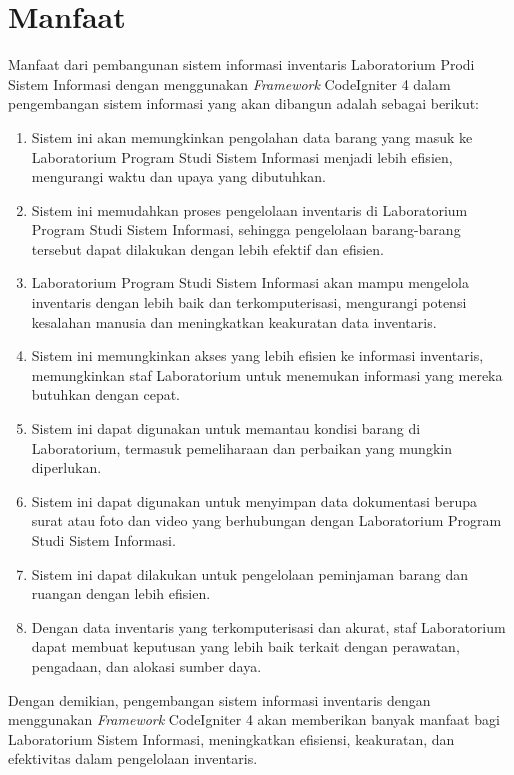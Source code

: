 \section{Manfaat}

Manfaat dari pembangunan sistem informasi inventaris Laboratorium Prodi Sistem Informasi dengan menggunakan \textit{Framework} CodeIgniter 4 dalam pengembangan sistem informasi yang akan dibangun adalah sebagai berikut:

\begin{enumerate}
  \item Sistem ini akan memungkinkan pengolahan data barang yang masuk ke Laboratorium Program Studi Sistem Informasi menjadi lebih efisien, mengurangi waktu dan upaya yang dibutuhkan.
  \item Sistem ini memudahkan proses pengelolaan inventaris di Laboratorium Program Studi Sistem Informasi, sehingga pengelolaan barang-barang tersebut dapat dilakukan dengan lebih efektif dan efisien.
  \item Laboratorium Program Studi Sistem Informasi akan mampu mengelola inventaris dengan lebih baik dan terkomputerisasi, mengurangi potensi kesalahan manusia dan meningkatkan keakuratan data inventaris.
  \item Sistem ini memungkinkan akses yang lebih efisien ke informasi inventaris, memungkinkan staf Laboratorium untuk menemukan informasi yang mereka butuhkan dengan cepat.
  \item Sistem ini dapat digunakan untuk memantau kondisi barang di Laboratorium, termasuk pemeliharaan dan perbaikan yang mungkin diperlukan.
  \item Sistem ini dapat digunakan untuk menyimpan data dokumentasi berupa surat atau foto dan video yang berhubungan dengan Laboratorium Program Studi Sistem Informasi.
  \item Sistem ini dapat dilakukan untuk pengelolaan peminjaman barang dan ruangan dengan lebih efisien.
  \item Dengan data inventaris yang terkomputerisasi dan akurat, staf Laboratorium dapat membuat keputusan yang lebih baik terkait dengan perawatan, pengadaan, dan alokasi sumber daya.

\end{enumerate}

Dengan demikian, pengembangan sistem informasi inventaris dengan menggunakan \textit{Framework} CodeIgniter 4 akan memberikan banyak manfaat bagi Laboratorium Sistem Informasi, meningkatkan efisiensi, keakuratan, dan efektivitas dalam pengelolaan inventaris.

